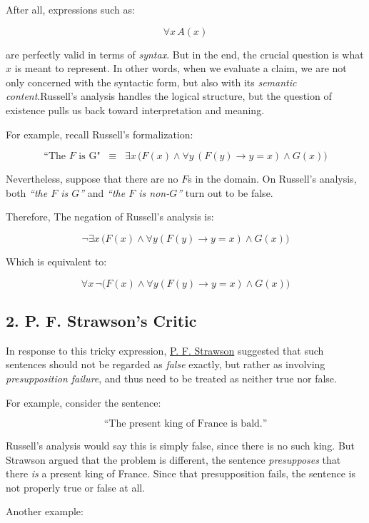 After all, expressions such as:

\[
\forall x \, A(x)
\]

are perfectly valid in terms of \emph{syntax}. But in the end, the
crucial question is what \(x\) is meant to represent. In other words,
when we evaluate a claim, we are not only concerned with the syntactic
form, but also with its \emph{semantic content}.Russell's analysis
handles the logical structure, but the question of existence pulls us
back toward interpretation and meaning.

For example, recall Russell's formalization:

\[
\text{“The } F \text{ is G"}\;\;\equiv\;\; \exists x \, \big( F(x) \land \forall y \, (F(y) \to y = x) \land G(x) \big)
\]

Nevertheless, suppose that there are no \(F\)s in the domain. On
Russell's analysis, both \emph{``the \(F\) is \(G\)''} and \emph{``the
\(F\) is non-\(G\)''} turn out to be false.

Therefore, The negation of Russell's analysis is:

\[
\lnot \exists x \, \big( F(x) \land \forall y (F(y) \to y = x) \land G(x) \big)
\]

Which is equivalent to:

\[
\forall x \, \lnot \big( F(x) \land \forall y (F(y) \to y = x) \land G(x) \big)
\]

\subsection{2. P. F. Strawson's Critic}\label{p.-f.-strawsons-critic}

In response to this tricky expression,
\href{https://en.wikipedia.org/wiki/P._F._Strawson}{P. F. Strawson}
suggested that such sentences should not be regarded as \emph{false}
exactly, but rather as involving \emph{presupposition failure}, and thus
need to be treated as neither true nor false.

For example, consider the sentence:

\[\text{“The present king of France is bald.”}\]

Russell's analysis would say this is simply false, since there is no
such king. But Strawson argued that the problem is different, the
sentence \emph{presupposes} that there \emph{is} a present king of
France. Since that presupposition fails, the sentence is not properly
true or false at all.

Another example:

